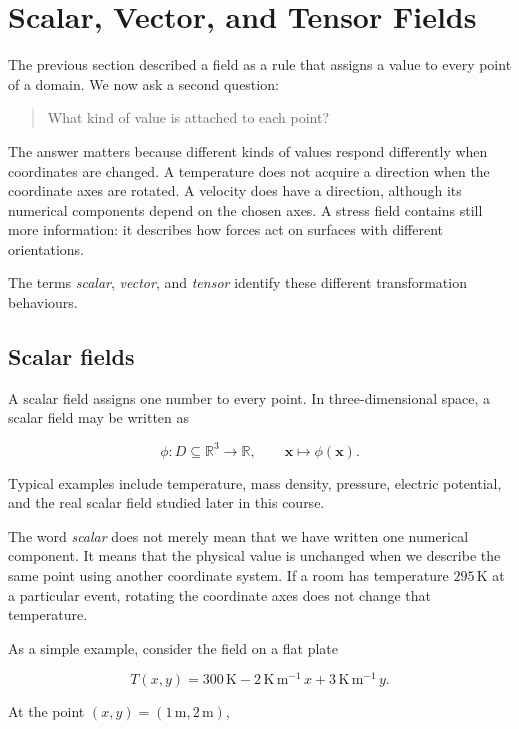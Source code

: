 \section{Scalar, Vector, and Tensor Fields}
\label{sec:scalar_vector_tensor_fields}

The previous section described a field as a rule that assigns a value to every point of a domain. We now ask a second question:

\begin{quote}
What kind of value is attached to each point?
\end{quote}

The answer matters because different kinds of values respond differently when coordinates are changed. A temperature does not acquire a direction when the coordinate axes are rotated. A velocity does have a direction, although its numerical components depend on the chosen axes. A stress field contains still more information: it describes how forces act on surfaces with different orientations.

The terms \emph{scalar}, \emph{vector}, and \emph{tensor} identify these different transformation behaviours.

\subsection{Scalar fields}

A scalar field assigns one number to every point. In three-dimensional space, a scalar field may be written as

\[
\phi : D\subseteq\mathbb{R}^{3}\longrightarrow\mathbb{R},
\qquad
\mathbf{x}\longmapsto\phi(\mathbf{x}).
\]

Typical examples include temperature, mass density, pressure, electric potential, and the real scalar field studied later in this course.

The word \emph{scalar} does not merely mean that we have written one numerical component. It means that the physical value is unchanged when we describe the same point using another coordinate system. If a room has temperature \(295\,\mathrm{K}\) at a particular event, rotating the coordinate axes does not change that temperature.

As a simple example, consider the field on a flat plate

\[
T(x,y)
=
300\,\mathrm{K}
-
2\,\mathrm{K\,m^{-1}}\,x
+
3\,\mathrm{K\,m^{-1}}\,y.
\]

At the point \((x,y)=(1\,\mathrm{m},2\,\mathrm{m})\),

